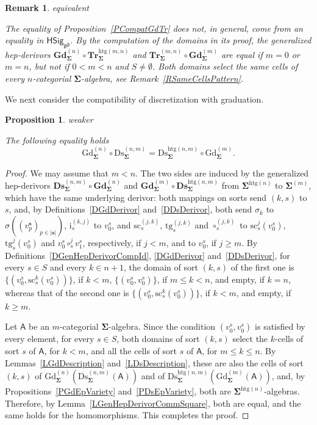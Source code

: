 \documentclass[a4paper, reqno]{amsbook}
\makeatletter
\newcommand{\bb}[1]{\ensuremath{\lvert #1 \rvert}}
\newcommand{\sig}[1]{\mathbf{#1}}             %
\newcommand{\calg}[1]{\boldsymbol{\mathsf{#1}}} %
\newcommand{\gd}{\mathfrak{gd}}              %
\newcommand{\htg}{\mathrm{htg}}                %
\newcommand{\src}{\mathrm{sc}}
\newcommand{\tgt}{\mathrm{tg}}
\newcommand{\Gd}{\mathrm{Gd}}
\newcommand{\Ds}{\mathrm{Ds}}
\newcommand{\bGd}{\mathbf{Gd}}
\newcommand{\bDs}{\mathbf{Ds}}
\newcommand{\bTr}{\mathbf{Tr}}
\theoremstyle{plain}
\newtheorem{proposition}[theorem]{Proposition}
\newtheorem{remark}[theorem]{Remark}
\theoremstyle{definition}
\newcommand*{\CA@leanpending}{}
\newcommand*{\CA@leanrelation}{}
\newcommand*{\lean}[2]{%
  \ifcsname\string\color@lean@#1\endcsname\else
    \PackageError{main}{Unknown relation `#1' in \string\lean}{Use equivalent, weaker or stronger.}%
  \fi
  \gdef\CA@leanrelation{#1}%
  \gdef\CA@leanpending{#2}}
\makeatother
\begin{document}
\begin{remark}\label{RCompatGdTrDerivors}\lean{equivalent}{Dimensions.truncation_graduation_derivor,Dimensions.truncation_graduation_eq_iff,Dimensions.truncation_graduation_sameCells}
The equality of Proposition~\ref{PCompatGdTr} does not, in general, come from an equality in $\mathsf{HSig}_{\gd}$.
By the computation of the domains in its proof, the generalized hep-derivors $\bGd^{(n)}_{\sig{\Sigma}}\circ\bTr^{\htg(m,n)}_{\sig{\Sigma}}$ and $\bTr^{(m,n)}_{\sig{\Sigma}}\circ\bGd^{(m)}_{\sig{\Sigma}}$ are equal if $m=0$ or $m=n$, but not if $0<m<n$ and $S\neq\emptyset$.
Both domains select the same cells of every $n$-categorial $\sig{\Sigma}$-algebra, see Remark~\ref{RSameCellsPattern}.
\end{remark}

We next consider the compatibility of discretization with graduation.

\begin{proposition}\label{PCompatGdDs}\lean{weaker}{Dimensions.discretizationGraduationFunctor}
The following equality holds
$$
\Gd^{(n)}_{\sig{\Sigma}}\circ\Ds^{(n,m)}_{\sig{\Sigma}}=\Ds^{\htg(n,m)}_{\sig{\Sigma}}\circ\Gd^{(m)}_{\sig{\Sigma}}.
$$
\end{proposition}
\begin{proof}
We may assume that $m<n$.
The two sides are induced by the generalized hep-derivors $\bDs^{(n,m)}_{\sig{\Sigma}}\circ\bGd^{(n)}_{\sig{\Sigma}}$ and $\bGd^{(m)}_{\sig{\Sigma}}\circ\bDs^{\htg(n,m)}_{\sig{\Sigma}}$ from $\sig{\Sigma}^{\htg(n)}$ to $\sig{\Sigma}^{(m)}$, which have the same underlying derivor: both mappings on sorts send $(k,s)$ to $s$, and, by Definitions~\ref{DGdDerivor} and~\ref{DDsDerivor}, both send $\sigma_{k}$ to $\sigma((v^{\mathbf{s}}_{p})_{p\in\bb{\mathbf{s}}})$, $\mathrm{i}^{(k,j)}_{s}$ to $v^{s}_{0}$, and $\src^{(j,k)}_{s}$, $\tgt^{(j,k)}_{s}$ and $\circ^{(j,k)}_{s}$ to $\src^{j}_{s}(v^{s}_{0})$, $\tgt^{j}_{s}(v^{s}_{0})$ and $v^{s}_{0}\circ^{j}_{s}v^{s}_{1}$, respectively, if $j<m$, and to $v^{s}_{0}$, if $j\geq m$.
By Definitions~\ref{DGenHepDerivorCompId}, \ref{DGdDerivor} and~\ref{DDsDerivor}, for every $s\in S$ and every $k\in n+1$, the domain of sort $(k,s)$ of the first one is $\{(v^s_0,\src^k_s(v^s_0))\}$, if $k<m$, $\{(v^s_0,v^s_0)\}$, if $m\leq k<n$, and empty, if $k=n$, whereas that of the second one is $\{(v^s_0,\src^k_s(v^s_0))\}$, if $k<m$, and empty, if $k\geq m$.

Let $\calg{A}$ be an $m$-categorial $\sig{\Sigma}$-algebra.
Since the condition $(v^s_0,v^s_0)$ is satisfied by every element, for every $s\in S$, both domains of sort $(k,s)$ select the $k$-cells of sort $s$ of $\calg{A}$, for $k<m$, and all the cells of sort $s$ of $\calg{A}$, for $m\leq k\leq n$.
By Lemmas~\ref{LGdDescription} and~\ref{LDsDescription}, these are also the cells of sort $(k,s)$ of $\Gd^{(n)}_{\sig{\Sigma}}(\Ds^{(n,m)}_{\sig{\Sigma}}(\calg{A}))$ and of $\Ds^{\htg(n,m)}_{\sig{\Sigma}}(\Gd^{(m)}_{\sig{\Sigma}}(\calg{A}))$, and, by Propositions~\ref{PGdEpVariety} and~\ref{PDsEpVariety}, both are $\sig{\Sigma}^{\htg(n)}$-algebras.
Therefore, by Lemma~\ref{LGenHepDerivorCommSquare}, both are equal, and the same holds for the homomorphisms. This completes the proof.
\end{proof}
\end{document}
